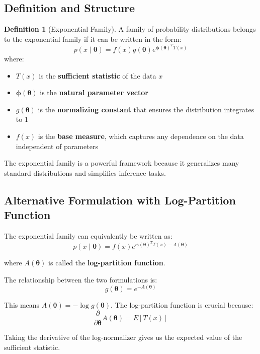 \documentclass[12pt,a4paper]{article}
\theoremstyle{definition}
\newtheorem{definition}{Definition}[section]
\begin{document}
\subsection{Definition and Structure}

\begin{definition}[Exponential Family]
A family of probability distributions belongs to the exponential family if it can be written in the form:
\[
p(x \mid \boldsymbol{\theta}) = f(x) g(\boldsymbol{\theta}) e^{\boldsymbol{\phi}(\boldsymbol{\theta})^T T(x)}
\]
where:
\begin{itemize}
    \item $T(x)$ is the \textbf{sufficient statistic} of the data $x$
    \item $\boldsymbol{\phi}(\boldsymbol{\theta})$ is the \textbf{natural parameter vector}
    \item $g(\boldsymbol{\theta})$ is the \textbf{normalizing constant} that ensures the distribution integrates to 1
    \item $f(x)$ is the \textbf{base measure}, which captures any dependence on the data independent of parameters
\end{itemize}
\end{definition}

The exponential family is a powerful framework because it generalizes many standard distributions and simplifies inference tasks.

\subsection{Alternative Formulation with Log-Partition Function}

The exponential family can equivalently be written as:
\[
p(x \mid \boldsymbol{\theta}) = f(x) e^{\boldsymbol{\phi}(\boldsymbol{\theta})^T T(x) - A(\boldsymbol{\theta})}
\]

where $A(\boldsymbol{\theta})$ is called the \textbf{log-partition function}. 

The relationship between the two formulations is:
\[
g(\boldsymbol{\theta}) = e^{-A(\boldsymbol{\theta})}
\]

This means $A(\boldsymbol{\theta}) = -\log g(\boldsymbol{\theta})$. The log-partition function is crucial because:
\[
\frac{\partial}{\partial \boldsymbol{\theta}} A(\boldsymbol{\theta}) = E[T(x)]
\]

Taking the derivative of the log-normalizer gives us the expected value of the sufficient statistic.
\end{document}
